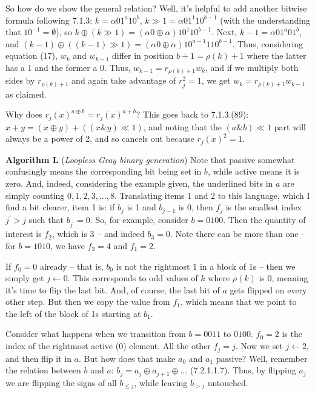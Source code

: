 So how do we show the general relation?  Well, it's helpful to add another
bitwise formula following 7.1.3: $k = \alpha 0 1^a 1 0^b$,
$k \gg 1 = \alpha 0 1^1 1 0^{b-1}$ (with the understanding that
$1 0^{-1} = \emptyset$), so $k \oplus \left(k \gg 1\right) = 
\left(\alpha 0 \oplus \alpha\right) 1 0^1 1 0^{b-1}$.
Next, $k - 1 = \alpha 0 1^a 0 1^b$, and $\left(k - 1\right) \oplus
\left(\left(k - 1\right) \gg 1\right) = \left(\alpha 0 \oplus \alpha\right)
1 0^{a-1} 1 1 0^{b-1}$.  Thus, considering equation (17),
$w_k$ and $w_{k-1}$ differ in position $b + 1 = \rho(k) + 1$
where the latter has a 1 and the former a 0.  Thus,
$w_{k-1} = r_{\rho\left(k\right) + 1} w_k$, and if we multiply
both sides by $r_{\rho \left( k \right)+1}$ and again take advantage
of $r_j^2 = 1$, we get $w_k = r_{\rho\left(k\right) + 1} w_{k-1}$
as claimed.

 Why does $r_j\left(x\right)^{a \oplus b} =
r_j\left(x\right)^{a+b}$?  This goes back to 7.1.3.(89):  
$x + y = \left(x \oplus y\right) + \left(\left(x \& y \right) \ll 1\right)$,
and noting that the $\left(a \& b\right) \ll 1$ part will always be a power
of 2, and so cancels out because $r_j\left(x\right)^2 = 1$.

  {\bf Algorithm L} ({\it Loopless Gray binary 
generation})\hfil\break
Note that passive somewhat confusingly means the corresponding
bit being set in $b$, while active means it is zero.  And, indeed,
considering the example given, the underlined bits in $a$ are
simply counting $0, 1, 2, 3, \ldots , 8$.  Translating items 1 and 2
to this language, which I find a bit clearer, item 1 is:
if $b_j$ is 1 and $b_{j-1}$ is 0, then $f_j$ is the smallest index
$j^{\prime} > j$ such that $b_{j^{\prime}} = 0$.  So, for example,
consider $b = 0100$.  Then the quantity of interest is $f_2$,
which is 3 -- and indeed $b_3 = 0$.  Note there can be more
than one -- for $b=1010$, we have $f_3 = 4$ and $f_1 = 2$.

If $f_0 = 0$ already -- that is, $b_0$ is not the rightmost 1
in a block of 1s -- then we simply get $j \gets 0$.  This corresponds
to odd values of $k$ where $\rho\left(k\right)$ is 0, meaning it's
time to flip the last bit.  And, of course, the last bit of $a$ gets
flipped on every other step.  But then we copy the value from $f_1$,
which means that we point to the left of the block of 1s starting at
$b_1$.

Consider what happens when we transition from $b=0011$
to $0100$.  $f_0 = 2$ is the index of the rightmost active (0) element.
All the other $f_j = j$. Now we set $j \gets 2$, and then flip it in $a$.
But how does that make $a_0$ and $a_1$ passive?  Well, remember
the relation between $b$ and $a$: $b_j = a_j \oplus a_{j+1} \oplus \ldots$
(7.2.1.1.7). Thus, by flipping $a_j$ we are flipping the signs of all $b_{\le j}$,
while leaving $b_{>j}$ untouched.

